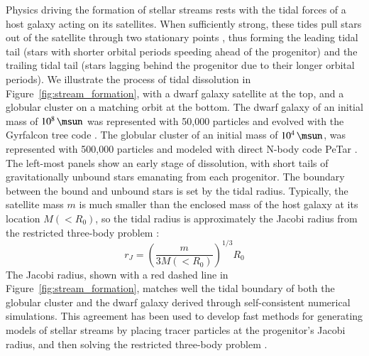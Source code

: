 \documentclass[final,5p,times,twocolumn,authoryear]{elsarticle}
\begin{document}
Physics driving the formation of stellar streams rests with the tidal forces of a host galaxy acting on its satellites.
When sufficiently strong, these tides pull stars out of the satellite through two stationary points \citep{bt:2008}, thus forming the leading tidal tail (stars with shorter orbital periods speeding ahead of the progenitor) and the trailing tidal tail (stars lagging behind the progenitor due to their longer orbital periods).
We illustrate the process of tidal dissolution in Figure~\ref{fig:stream_formation}, with a dwarf galaxy satellite at the top, and a globular cluster on a matching orbit at the bottom.
The dwarf galaxy of an initial mass of $10^8\,\unit{\msun}$ was represented with 50,000 particles and evolved with the Gyrfalcon tree code \citep{dehnen:2014}.
The globular cluster of an initial mass of $10^4\,\unit{\msun}$, was represented with 500,000 particles and modeled with direct N-body code PeTar \citep{wang:2020}.
The left-most panels show an early stage of dissolution, with short tails of gravitationally unbound stars emanating from each progenitor.
The boundary between the bound and unbound stars is set by the tidal radius.
Typically, the satellite mass $m$ is much smaller than the enclosed mass of the host galaxy at its location $M(<R_0)$, so the tidal radius is approximately the Jacobi radius from the restricted three-body problem \citep[][]{szebehely:1967, valtonen:2006}:
\begin{equation}
r_J = \left(\frac{m}{3M(<R_0)}\right)^{1/3} R_0
\end{equation}
The Jacobi radius, shown with a red dashed line in Figure~\ref{fig:stream_formation}, matches well the tidal boundary of both the globular cluster and the dwarf galaxy derived through self-consistent numerical simulations.
This agreement has been used to develop fast methods for generating models of stellar streams by placing tracer particles at the progenitor's Jacobi radius, and then solving the restricted three-body problem \citep[the so-called \emph{particle-spray methods};][]{varghese:2011, lane:2012, kupper:2012, bonaca:2014, gibbons:2014, fardal:2015}.
\end{document}

